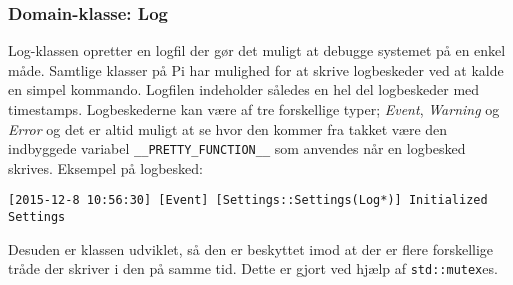 \subsubsection{Domain-klasse: Log} \label{sec:log_klasse}

Log-klassen opretter en logfil der gør det muligt at debugge systemet på en enkel måde. Samtlige klasser på Pi har mulighed for at skrive logbeskeder ved at kalde en simpel kommando. Logfilen indeholder således en hel del logbeskeder med timestamps. Logbeskederne kan være af tre forskellige typer; \textit{Event}, \textit{Warning} og \textit{Error} og det er altid muligt at se hvor den kommer fra takket være den indbyggede variabel \texttt{\_\_PRETTY\_FUNCTION\_\_} \cite{lib:prettyf} som anvendes når en logbesked skrives. Eksempel på logbesked:

\texttt{[2015-12-8 10:56:30] [Event] [Settings::Settings(Log*)] Initialized Settings}

Desuden er klassen udviklet, så den er beskyttet imod at der er flere forskellige tråde der skriver i den på samme tid. Dette er gjort ved hjælp af \texttt{std::mutex}es.